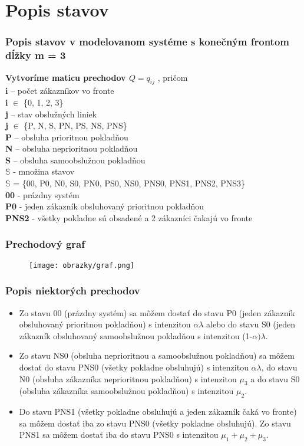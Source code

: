 \documentclass[hyperref={pdfpagelabels=false}]{beamer}
\begin{document}
\section{Popis stavov} 
\begin{frame}
\frametitle{Popis stavov v modelovanom systéme s konečným frontom dĺžky m = 3}
{\bf Vytvoríme maticu prechodov $Q = q_{ij}$} , pričom \\ 
\medskip
{\bf i} – počet zákazníkov vo fronte\\
{\bf i} $\in$ \{0, 1, 2, 3\}\\
\medskip
{\bf j} – stav obslužných liniek\\
{\bf j} $\in$ \{P, N, S, PN, PS, NS, PNS\}\\
\medskip
{\bf P} – obsluha prioritnou pokladňou\\
{\bf N} – obsluha neprioritnou pokladňou\\
{\bf S} – obsluha samoobslužnou pokladňou\\
\medskip
$\mathbb{S}$ - množina stavov\\
{\color{red} $\mathbb{S}$ = \{00, P0, N0, S0, PN0, PS0, NS0, PNS0, PNS1, PNS2, PNS3\}}\\
\medskip
{\bf 00} - prázdny systém\\
{\bf P0} - jeden zákazník obsluhovaný prioritnou pokladňou\\
{\bf PNS2} - všetky pokladne sú obsadené a 2 zákazníci čakajú vo fronte

\end{frame}

\begin{frame}
\frametitle{Prechodový graf}
\begin{figure}[!hlrbt]
\begin{center}
\texttt{[image: obrazky/graf.png]}
\end{center}
\end{figure}
\end{frame}

\begin{frame}
\frametitle{Popis niektorých prechodov}
\begin{itemize}
\item Zo stavu 00 (prázdny systém) sa môžem dostať do stavu P0 (jeden zákazník obsluhovaný prioritnou pokladňou) s intenzitou $\alpha\lambda$ alebo do stavu S0 (jeden zákazník obsluhovaný samoobslužnou pokladňou s intenzitou (1-$\alpha)\lambda$. 
\item Zo stavu NS0 (obsluha neprioritnou a samoobslužnou pokladňou) sa môžem dostať do stavu PNS0 (všetky pokladne obsluhujú) s intenzitou $\alpha\lambda$, do stavu N0 (obsluha zákazníka neprioritnou pokladňou) s intenzitou $\mu_3$ a do stavu S0 (obsluha zákazníka samoobslužnou pokladňou) s intenzitou $\mu_2$. 
\item Do stavu PNS1 (všetky pokladne obsluhujú a jeden zákazník čaká vo fronte) sa môžem dostať iba zo stavu PNS0 (všetky pokladne obsluhujú). Zo stavu PNS1 sa môžem dostať iba do stavu PNS0 s intenzitou $\mu_1+\mu_2+\mu_3$.
\end{itemize}
\end{frame}
\end{document}

